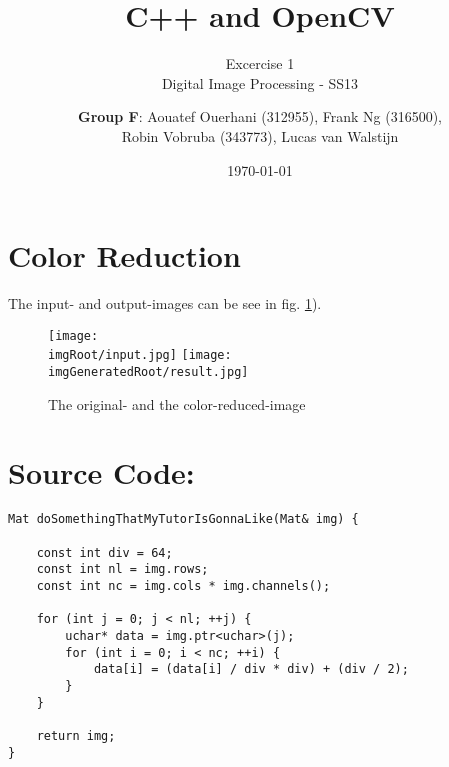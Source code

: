 \documentclass[a4paper,headings=small]{scrartcl}
\title{C++ and OpenCV}
\subtitle{Excercise 1 \\ Digital Image Processing - SS13}
\author{\textbf{Group F}: Aouatef Ouerhani (312955), Frank Ng (316500),\\ Robin Vobruba (343773), Lucas van Walstijn}
\date{\today}
\numberwithin{equation}{section} %
\numberwithin{figure}{section}   %
\newcommand{\imgRoot}{../resources/img}
\newcommand{\imgGeneratedRoot}{../../../target}
\begin{document}
\maketitle

\section{Color Reduction}

The input- and output-images can be see in
fig. \ref{fig:inOutImg}).

\begin{figure}[htbp]
	\centering
	\texttt{[image: \\imgRoot/input.jpg]}
	\texttt{[image: \\imgGeneratedRoot/result.jpg]}
	\caption{The original- and the color-reduced-image}
	\label{fig:inOutImg}
\end{figure}


\newpage
\section{Source Code:}

\begin{lstlisting}[label=interstingFunction,caption=The function with the color-reduction code.]
Mat doSomethingThatMyTutorIsGonnaLike(Mat& img) {

	const int div = 64;
	const int nl = img.rows;
	const int nc = img.cols * img.channels();

	for (int j = 0; j < nl; ++j) {
		uchar* data = img.ptr<uchar>(j);
		for (int i = 0; i < nc; ++i) {
			data[i] = (data[i] / div * div) + (div / 2);
		}
	}

	return img;
}
\end{lstlisting}
\end{document}
